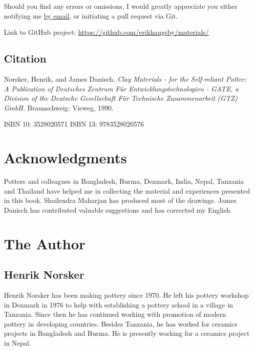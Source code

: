 Should you find any errors or omissions, I would greatly appreciate you either 
notifying me \href{mailto:e@erikhaugsby.com}{by email}, or initiating a pull 
request via Git. 

Link to GitHub project: 
\href{https://github.com/erikhaugsby/materials/}{https://github.com/erikhaugsby/materials/}
\subsection*{Citation}

Norsker, Henrik, and James Danisch. \textit{Clay Materials - for the 
  Self-reliant Potter: A Publication of Deutsches Zentrum F\"{u}r 
  Entwicklungstechnologien - GATE, a Division of the Deutsche Gesellschaft 
  F\"{u}r Technische Zusammenarbeit (GTZ) GmbH.} Braunschweig: Vieweg, 1990.

ISBN 10: 3528020571  ISBN 13: 9783528020576
\newpage
\section*{Acknowledgments}
Potters and colleagues in Bangladesh, Burma, Denmark, India, Nepal, Tanzania 
and Thailand have helped me in collecting the material and experiences 
presented in this book. Shailendra Maharjan has produced most of the drawings. 
James Danisch has contributed valuable suggestions and has corrected my English.
\section*{The Author}
\subsection*{Henrik Norsker} 
Henrik Norsker has been making pottery since 1970. He left his pottery workshop 
in Denmark in 1976 to help with establishing a pottery school in a village in 
Tanzania. Since then he has continued working with promotion of modern pottery 
in developing countries. Besides Tanzania, he has worked for ceramics projects 
in Bangladesh and Burma. He is presently working for a ceramics project in 
Nepal.
